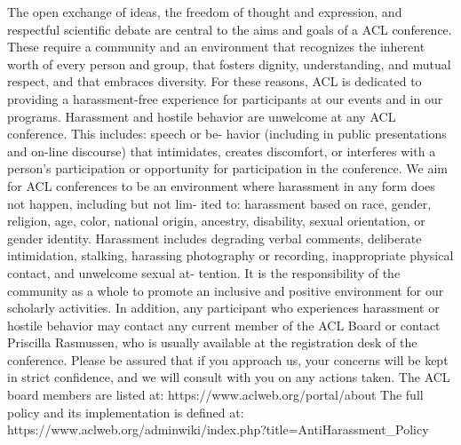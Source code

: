 The open exchange of ideas, the freedom of thought and expression, and respectful scientific debate are central to the aims and goals of a ACL conference. These require a community and an environment that recognizes the inherent worth of every person and group, that fosters dignity, understanding, and mutual respect, and that embraces diversity. For these reasons, ACL is dedicated to providing a harassment-free experience for participants at our events and in our programs.
Harassment and hostile behavior are unwelcome at any ACL conference. This includes: speech or be- havior (including in public presentations and on-line discourse) that intimidates, creates discomfort, or interferes with a person’s participation or opportunity for participation in the conference. We aim for ACL conferences to be an environment where harassment in any form does not happen, including but not lim- ited to: harassment based on race, gender, religion, age, color, national origin, ancestry, disability, sexual orientation, or gender identity. Harassment includes degrading verbal comments, deliberate intimidation, stalking, harassing photography or recording, inappropriate physical contact, and unwelcome sexual at- tention.
It is the responsibility of the community as a whole to promote an inclusive and positive environment for our scholarly activities. In addition, any participant who experiences harassment or hostile behavior may contact any current member of the ACL Board or contact Priscilla Rasmussen, who is usually available at the registration desk of the conference. Please be assured that if you approach us, your concerns will be kept in strict confidence, and we will consult with you on any actions taken.
The ACL board members are listed at:
https://www.aclweb.org/portal/about
The full policy and its implementation is defined at:
https://www.aclweb.org/adminwiki/index.php?title=Anti\-Harassment\_Policy